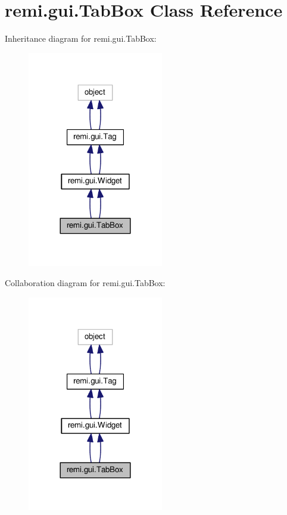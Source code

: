 \hypertarget{classremi_1_1gui_1_1TabBox}{}\section{remi.\+gui.\+Tab\+Box Class Reference}
\label{classremi_1_1gui_1_1TabBox}


Inheritance diagram for remi.\+gui.\+Tab\+Box\+:
\nopagebreak
\begin{figure}[H]
\begin{center}
\leavevmode
\includegraphics[width=168pt]{d5/d82/classremi_1_1gui_1_1TabBox__inherit__graph}
\end{center}
\end{figure}


Collaboration diagram for remi.\+gui.\+Tab\+Box\+:
\nopagebreak
\begin{figure}[H]
\begin{center}
\leavevmode
\includegraphics[width=168pt]{d4/d9e/classremi_1_1gui_1_1TabBox__coll__graph}
\end{center}
\end{figure}
